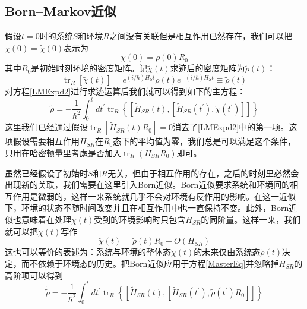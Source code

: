 \subsection{Born--Markov近似}
假设$t=0$时的系统$S$和环境$R$之间没有关联但是相互作用已然存在，我们可以把$\chi(0)=\tilde{\chi}(0)$表示为
\begin{equation}
\chi(0)=\rho(0) R_{0}
\end{equation}
其中$R_{0}$是初始时刻环境的密度矩阵。记$\tilde{\chi}(t)$求迹后的密度矩阵为$\tilde{\rho}(t)$：
\begin{equation}
\operatorname{tr}_{R}[\tilde{\chi}(t)]=e^{(i / \hbar) H_{S} t} \rho(t) e^{-(i / \hbar) H_{S} t} \equiv \tilde{\rho}(t)
\label{InitialAssumption}
\end{equation}
对方程\eqref{LMExpd2}进行求迹运算后我们就可以得到如下的主方程：
\begin{equation}
\dot{\tilde{\rho}}=-\frac{1}{\hbar^{2}} \int_{0}^{t} d t^{\prime} \operatorname{tr}_{R}\left\{\left[\tilde{H}_{S R}(t),\left[\tilde{H}_{S R}\left(t^{\prime}\right), \tilde{\chi}\left(t^{\prime}\right)\right]\right]\right\}
\label{MasterEq}
\end{equation}
这里我们已经通过假设$\operatorname{tr}_{R}\left[\tilde{H}_{S R}(t) R_{0}\right]=0$消去了\eqref{LMExpd2}中的第一项。这项假设需要相互作用$H_{S R}$在$R_{0}$态下的平均值为零，我们总是可以满足这个条件，只用在哈密顿量里考虑是否加入$\operatorname{tr}_{R}\left(H_{S R} R_{0}\right)$即可。

虽然已经假设了初始时$S$和$R$无关，但由于相互作用的存在，之后的时刻里必然会出现新的关联，我们需要在这里引入Born近似。Born近似要求系统和环境间的相互作用是微弱的，这样一来系统就几乎不会对环境有反作用的影响。在这一近似下，环境的状态不随时间改变并且在相互作用中也一直保持不变。此外，Born近似也意味着在处理$\chi(t)$受到的环境影响时只包含$H_{SR}$的同阶量。这样一来，我们就可以把$\tilde{\chi}(t)$写作
\begin{equation}
\tilde{\chi}(t)=\tilde{\rho}(t) R_{0}+O\left(H_{S R}\right)
\end{equation}
这也可以等价的表述为：系统与环境的整体态$\tilde{\chi}(t)$的未来仅由系统态$\tilde{\rho}(t)$决定，而不依赖于环境态的历史。把Born近似应用于方程\eqref{MasterEq}并忽略掉$H_{S R}$的高阶项可以得到
\begin{equation}
\dot{\tilde{\rho}}=-\frac{1}{\hbar^{2}} \int_{0}^{t} d t^{\prime} \operatorname{tr}_{R}\left\{\left[\tilde{H}_{S R}(t),\left[\tilde{H}_{S R}\left(t^{\prime}\right), \tilde{\rho}\left(t^{\prime}\right) R_{0}\right]\right]\right\}
\label{MasterEqBorn}
\end{equation}

